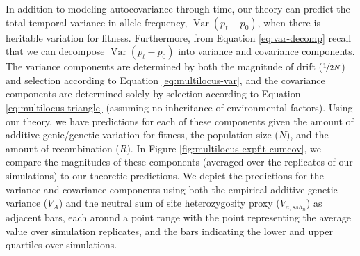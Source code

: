\documentclass[11pt]{article}
\newcommand{\vb}[1]{{\it \color{blue} #1}}
\DeclareMathOperator{\var}{Var}
\begin{document}

In addition to modeling autocovariance through time, our theory can predict the
total temporal variance in allele frequency, $\var(p_t - p_0)$, when there is
heritable variation for fitness. Furthermore, from Equation
\eqref{eq:var-decomp} recall that we can decompose $\var(p_t - p_0)$ into
variance and covariance components. The variance components are determined by
both the magnitude of drift ($\nicefrac{1}{2N}$) and selection according to
Equation \eqref{eq:multilocus-var}, and the covariance components are
determined solely by selection according to Equation
\eqref{eq:multilocus-triangle} (assuming no inheritance of environmental
factors). Using our theory, we have predictions for each of these components
given the amount of additive genic/genetic variation for fitness, the
population size ($N$), and the amount of recombination ($R$). In Figure
\ref{fig:multilocus-expfit-cumcov}, we compare the magnitudes of these
components (averaged over the replicates of our simulations) to our theoretic
predictions. We depict the predictions for the variance and covariance
components using both the empirical additive genetic variance ($V_A$) and the
neutral sum of site heterozygosity proxy ($V_{a,ssh_n}$) as adjacent bars, each
around a point range with the point representing the average value over
simulation replicates, and the bars indicating the lower and upper quartiles
over simulations. 
\end{document}
